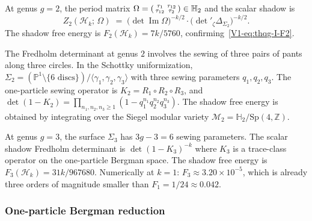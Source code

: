\begin{example}
At genus $g = 2$, the period matrix $\Omega = \begin{psmallmatrix} \tau_1 & \tau_{12} \\ \tau_{12} & \tau_2 \end{psmallmatrix} \in \mathbb{H}_2$ and the scalar shadow is
\begin{equation}%
Z_2(\mathcal{H}_k;\,\Omega) \;=\; \bigl(\det\operatorname{Im}\Omega\bigr)^{-k/2} \cdot \bigl(\det{}'_\zeta \Delta_{\Sigma_2}\bigr)^{-k/2}.
\end{equation}
The shadow free energy is $F_2(\mathcal{H}_k) = 7k/5760$, confirming~\eqref{V1-eq:thqg-I-F2}.

The Fredholm determinant at genus $2$ involves the sewing of three pairs of pants along three circles. In the Schottky uniformization, $\Sigma_2 = (\mathbb{P}^1 \setminus \{6 \text{ discs}\}) / \langle \gamma_1, \gamma_2, \gamma_3 \rangle$ with three sewing parameters $q_1, q_2, q_3$. The one-particle sewing operator is $K_2 = R_1 \circ R_2 \circ R_3$, and $\det(1 - K_2) = \prod_{n_1,n_2,n_3 \geq 1} (1 - q_1^{n_1} q_2^{n_2} q_3^{n_3})$. The shadow free energy is obtained by integrating over the Siegel modular variety $\mathcal{M}_2 = \mathbb{H}_2 / \mathrm{Sp}(4,\mathbb{Z})$.
\end{example}

\begin{example}[Genus $3$]
At genus $g = 3$, the surface $\Sigma_3$ has $3g - 3 = 6$ sewing parameters. The scalar shadow Fredholm determinant is $\det(1 - K_3)^{-k}$ where $K_3$ is a trace-class operator on the one-particle Bergman space. The shadow free energy is $F_3(\mathcal{H}_k) = 31k/967680$. Numerically at $k = 1$: $F_3 \approx 3.20 \times 10^{-5}$, which is already three orders of magnitude smaller than $F_1 = 1/24 \approx 0.042$.
\end{example}

\subsubsection{One-particle Bergman reduction}


